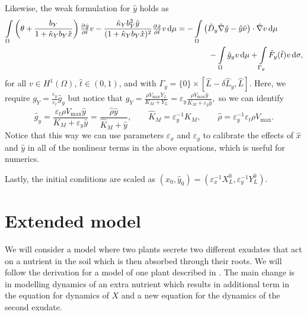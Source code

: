 \documentclass[11pt]{article}
\begin{document}
Likewise, the weak formulation for \(\hat y\) holds as
\begin{equation}
\label{eq:non-dim-y}
\begin{aligned}
    \int\limits_\Omega
    \left( \theta + \frac{b_Y}{1 + \hat{\kappa}_Y b_Y \hat{x}} \right)  \pd{\hat{y}}{\hat{t}} v 
    -
    \frac{\hat{\kappa}_Y b_Y^2 \hat{y}}{(1+\hat{\kappa}_Y b_Y \hat{x})^2} \pd{\hat x}{\hat t} v
    \dif\mu
    &=
    -\int\limits_\Omega 
    \big(\hat{D}_y \hat{\nabla} \hat{y} - \hat{y}\hat{\nu} \big) \cdot \hat{\nabla} v \dif\mu
    \\
    &\qquad\qquad
    -\int\limits_\Omega \hat{g}_y v \dif\mu
    +\int\limits_{\Gamma_{y}}    \hat{F}_y (\hat t) v    \dif \sigma,
\end{aligned}
\end{equation}
for all \( v\in H^1 (\Omega)\), \(\hat{t}\in (0,1)\), and
with $\Gamma_{y} = \{0\}\times [\hat{L}-\delta \hat{L}_y,\hat{L}]$. Here, we require \( g_Y = \frac{\varepsilon_y}{\varepsilon_t} \hat{g}_y \) but notice that
\(
    g_Y = \frac{\rho V_{\max} Y_L}{K_M + Y_L}
    = \varepsilon_y \frac{\rho V_{\max} \hat{y}}{K_M + \varepsilon_y \hat{y}},
\)
so we can identify 
\[ 
    \hat{g}_y = \frac{ \varepsilon_t \rho V_{\max} \hat{y}}{K_M + \varepsilon_y \hat{y}}
    =
    \frac{ \hat{\rho} \hat{y}}{ \hat{K}_M + \hat{y}},
    \qquad
    \hat{K}_M = \varepsilon_y^{-1} K_M,
    \qquad
    \hat{\rho} = \varepsilon_y^{-1} \varepsilon_t \rho V_{\max}.
\]
Notice that this way we can use parameters \(\varepsilon_x\) and \(\varepsilon_y\) to calibrate the effects of \( \hat{x}\) and \(\hat{y}\) in all of the nonlinear terms in the above equations, which is useful for numerics.

Lastly, the initial conditions are scaled as \( (\hat{x}_0,\hat{y}_0) = (\varepsilon_x^{-1} X^0_L, \varepsilon_y^{-1} Y^0_L) \). 











\newpage

\section{Extended model}
We will consider a model where two plants secrete two different exudates that act on a nutrient in the soil which is then absorbed through their roots. We will follow the derivation for a model of one plant described in \cite{Ptashnyk-2011}. The main change is in modelling dynamics of an extra nutrient which results in additional term in the equation for dynamics of $X$ and a new equation for the dynamics of the second exudate.
	
\end{document}
